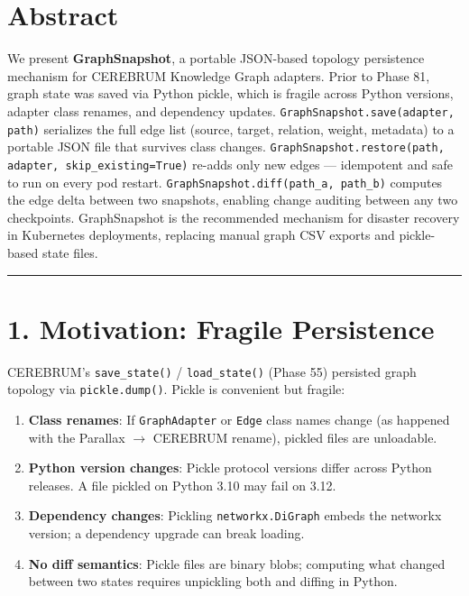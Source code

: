 
\section*{Abstract}

We present \textbf{GraphSnapshot}, a portable JSON-based topology persistence mechanism for CEREBRUM Knowledge Graph adapters. Prior to Phase 81, graph state was saved via Python pickle, which is fragile across Python versions, adapter class renames, and dependency updates. \texttt{GraphSnapshot.save(adapter, path)} serializes the full edge list (source, target, relation, weight, metadata) to a portable JSON file that survives class changes. \texttt{GraphSnapshot.restore(path, adapter, skip\_existing=True)} re-adds only new edges --- idempotent and safe to run on every pod restart. \texttt{GraphSnapshot.diff(path\_a, path\_b)} computes the edge delta between two snapshots, enabling change auditing between any two checkpoints. GraphSnapshot is the recommended mechanism for disaster recovery in Kubernetes deployments, replacing manual graph CSV exports and pickle-based state files.

\medskip\noindent\rule{\linewidth}{0.4pt}\medskip

\section*{1. Motivation: Fragile Persistence}

CEREBRUM's \texttt{save\_state()} / \texttt{load\_state()} (Phase 55) persisted graph topology via \texttt{pickle.dump()}. Pickle is convenient but fragile:

\begin{enumerate}
  \item \textbf{Class renames}: If \texttt{GraphAdapter} or \texttt{Edge} class names change (as happened with the Parallax $\to$ CEREBRUM rename), pickled files are unloadable.
  \item \textbf{Python version changes}: Pickle protocol versions differ across Python releases. A file pickled on Python 3.10 may fail on 3.12.
  \item \textbf{Dependency changes}: Pickling \texttt{networkx.DiGraph} embeds the networkx version; a dependency upgrade can break loading.
  \item \textbf{No diff semantics}: Pickle files are binary blobs; computing what changed between two states requires unpickling both and diffing in Python.
\end{enumerate}


